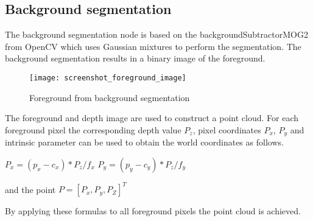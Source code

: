 \subsection{Background segmentation}

The background segmentation node is based on the backgroundSubtractorMOG2 from OpenCV \cite{BGS} which uses Gaussian mixtures to perform the segmentation. The background segmentation results in a binary image of the foreground. 

\begin{figure}[H]
\begin{center}
\texttt{[image: screenshot\_foreground\_image]}
\caption{Foreground from background segmentation}

\end{center}
\end{figure}

The foreground and depth image are used to construct a point cloud. For each foreground pixel the corresponding depth value $P_z$, pixel coordinates $P_x$, $P_y$ and intrinsic parameter can be used to obtain the world coordinates as follows.

$P_x = (p_x - c_x) * P_z / f_x$
$P_y = (p_y - c_y) * P_z / f_y$

and the point $P = [P_x, P_y, P_Z]^T$

By applying these formulas to all foreground pixels the point cloud is achieved.


